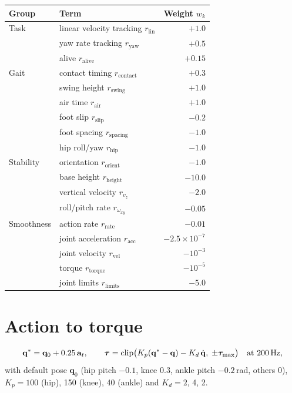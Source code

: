 \documentclass[11pt]{article}
\begin{document}
\begin{tabular}{@{}llr@{}}
\toprule
Group & Term & Weight $w_k$ \\
\midrule
Task      & linear velocity tracking $r_{\mathrm{lin}}$ & $+1.0$ \\
          & yaw rate tracking $r_{\mathrm{yaw}}$        & $+0.5$ \\
          & alive $r_{\mathrm{alive}}$                  & $+0.15$ \\
\midrule
Gait      & contact timing $r_{\mathrm{contact}}$       & $+0.3$ \\
          & swing height $r_{\mathrm{swing}}$           & $+1.0$ \\
          & air time $r_{\mathrm{air}}$                 & $+1.0$ \\
          & foot slip $r_{\mathrm{slip}}$               & $-0.2$ \\
          & foot spacing $r_{\mathrm{spacing}}$         & $-1.0$ \\
          & hip roll/yaw $r_{\mathrm{hip}}$             & $-1.0$ \\
\midrule
Stability & orientation $r_{\mathrm{orient}}$           & $-1.0$ \\
          & base height $r_{\mathrm{height}}$           & $-10.0$ \\
          & vertical velocity $r_{v_z}$                 & $-2.0$ \\
          & roll/pitch rate $r_{\omega_{xy}}$           & $-0.05$ \\
\midrule
Smoothness & action rate $r_{\mathrm{rate}}$            & $-0.01$ \\
          & joint acceleration $r_{\mathrm{acc}}$       & $-2.5\times10^{-7}$ \\
          & joint velocity $r_{\mathrm{vel}}$           & $-10^{-3}$ \\
          & torque $r_{\mathrm{torque}}$                & $-10^{-5}$ \\
          & joint limits $r_{\mathrm{limits}}$          & $-5.0$ \\
\bottomrule
\end{tabular}

\section*{Action to torque}

\begin{equation}
\mathbf{q}^{*} = \mathbf{q}_0 + 0.25\,\mathbf{a}_t, \qquad
\bm{\tau} = \operatorname{clip}\!\big(K_p (\mathbf{q}^{*} - \mathbf{q}) - K_d\, \dot{\mathbf{q}},\; \pm \bm{\tau}_{\max}\big)
\quad \text{at 200\,Hz},
\end{equation}
with default pose $\mathbf{q}_0$ (hip pitch $-0.1$, knee $0.3$, ankle pitch
$-0.2$\,rad, others 0), $K_p = 100$ (hip), 150 (knee), 40 (ankle) and
$K_d = 2$, 4, 2.
\end{document}
